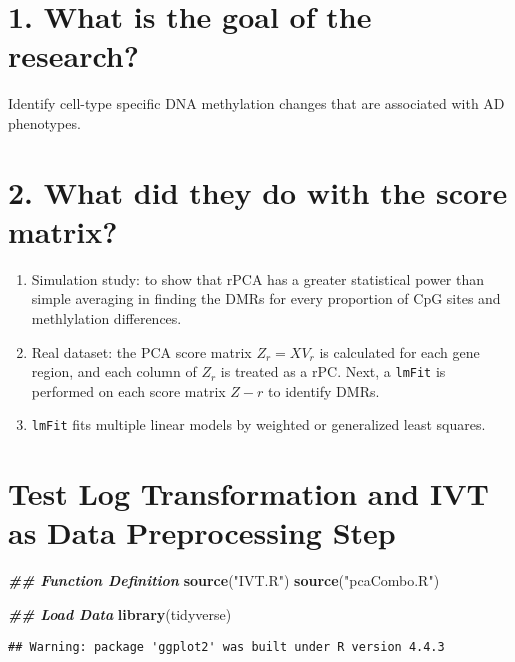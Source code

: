 \documentclass[
]{article}
\newenvironment{Shaded}{\begin{snugshade}}{\end{snugshade}}
\newcommand{\DocumentationTok}[1]{\textcolor[rgb]{0.56,0.35,0.01}{\textbf{\textit{#1}}}}
\newcommand{\FunctionTok}[1]{\textcolor[rgb]{0.13,0.29,0.53}{\textbf{#1}}}
\newcommand{\NormalTok}[1]{#1}
\newcommand{\StringTok}[1]{\textcolor[rgb]{0.31,0.60,0.02}{#1}}
\providecommand{\tightlist}{%
  \setlength{\itemsep}{0pt}\setlength{\parskip}{0pt}}
\begin{document}
\section{1. What is the goal of the
research?}\label{what-is-the-goal-of-the-research}

Identify cell-type specific DNA methylation changes that are associated
with AD phenotypes.

\section{2. What did they do with the score
matrix?}\label{what-did-they-do-with-the-score-matrix}

\begin{enumerate}
\def\labelenumi{\arabic{enumi}.}
\tightlist
\item
  Simulation study: to show that rPCA has a greater statistical power
  than simple averaging in finding the DMRs for every proportion of CpG
  sites and methlylation differences.
\item
  Real dataset: the PCA score matrix \(Z_r = X V_r\) is calculated for
  each gene region, and each column of \(Z_r\) is treated as a rPC.
  Next, a \texttt{lmFit} is performed on each score matrix \(Z-r\) to
  identify DMRs.
\item
  \texttt{lmFit} fits multiple linear models by weighted or generalized
  least squares.
\end{enumerate}

\section{Test Log Transformation and IVT as Data Preprocessing
Step}\label{test-log-transformation-and-ivt-as-data-preprocessing-step}

\begin{Shaded}
\begin{Highlighting}[]
\DocumentationTok{\#\# Function Definition}
\FunctionTok{source}\NormalTok{(}\StringTok{"IVT.R"}\NormalTok{)}
\FunctionTok{source}\NormalTok{(}\StringTok{"pcaCombo.R"}\NormalTok{)}

\DocumentationTok{\#\# Load Data}
\FunctionTok{library}\NormalTok{(tidyverse)}
\end{Highlighting}
\end{Shaded}

\begin{verbatim}
## Warning: package 'ggplot2' was built under R version 4.4.3
\end{verbatim}
\end{document}
